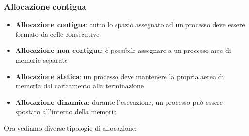 \documentclass[a4paper,12pt]{article}
\begin{document}
\subsubsection{Allocazione contigua}
\begin{itemize}
  \item \textbf{Allocazione contigua}: tutto lo spazio assegnato ad un processo deve essere formato da celle consecutive. 
  \item \textbf{Allocazione non contigua}: è possibile assegnare a un processo aree di memorie separate
  \item \textbf{Allocazione statica}: un processo deve mantenere la propria aerea di memoria dal  caricamento alla terminazione
  \item \textbf{Allocazione dinamica}: durante l'esecuzione, un processo può essere spostato all'interno della memoria
\end{itemize}
Ora vediamo diverse tipologie di allocazione:
\end{document}
